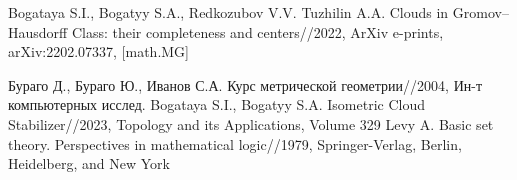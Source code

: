 \documentclass[11pt,twoside,draft
]{article}
\begin{document}
\begin{thebibliography}{99}
	Bogataya S.I., Bogatyy S.A., Redkozubov V.V. Tuzhilin A.A. Clouds in Gromov–Hausdorff Class: their
	completeness and centers//2022, ArXiv e-prints,
	arXiv:2202.07337, [math.MG]



	Бураго Д., Бураго Ю., Иванов С.А. Курс метрической геометрии//2004, Ин-т компьютерных исслед.
	Bogataya S.I., Bogatyy S.A. Isometric Cloud Stabilizer//2023, Topology and its Applications,
	Volume 329
	Levy A. Basic set theory. Perspectives in mathematical logic//1979, Springer-Verlag, Berlin, Heidelberg, and New York





\end{thebibliography}


\label{end}
\end{document}
